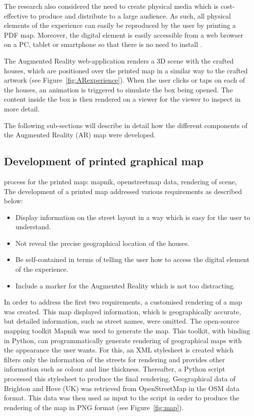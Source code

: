 \documentclass[acmlarge,screen,dvipsnames]{acmart}
\begin{document}
The research also considered the need to create physical media which is
cost-effective to produce and distribute to a large audience. As such, all
physical elements of the experience can easily be reproduced by the user by
printing a PDF map. Moreover, the digital element is easily accessible from a
web browser on a PC, tablet or smartphone so that there is no need to install
. 

The Augmented Reality web-application renders a 3D scene with the crafted
houses, which are positioned over the printed map in a similar way to the
crafted artwork (see Figure~\ref{fig:ARexperience}). When the user clicks or
taps on each of the houses, an animation is triggered to simulate the box
being opened. The content inside the box is then rendered on a viewer for the
viewer to inspect in more detail. 

The following sub-sections will describe in detail how the different
components of the Augmented Reality (AR) map were developed.

\subsection{Development of printed graphical map} %
process for the printed map: mapnik, openstreetmap data, rendering of scene, 
The development of a printed map addressed various requirements as described
below:

\begin{itemize} 
  \item Display information on the street layout in a way which is easy for the user to understand. 
  \item Not reveal the precise geographical location of the houses. 
  \item Be self-contained in terms of telling the user how to access 
  the digital element of the experience. 
  \item Include a marker for the Augmented Reality which is not too distracting. 
\end{itemize}

In order to address the first two requirements, a customised rendering of a
map was created. This map displayed information, which is geographically
accurate, but detailed information, such as street names, were omitted. The
open-source mapping toolkit Mapnik \cite{mapnik} was used to generate the map.
This toolkit, with binding in Python, can programmatically generate rendering
of geographical maps with the appearance the user wants. For this, an XML
stylesheet is created which filters only the information of the streets for
rendering and provides other information such as colour and line thickness.
Thereafter, a Python script processed this stylesheet to produce the final
rendering. Geographical data of Brighton and Hove (UK) was retrieved from OpenStreetMap
\cite{OpenStreetMap} in the OSM data format. This data was then used as input
to the script in order to produce the rendering of the map in PNG format (see
Figure~\ref{fig:map}).
\end{document}
